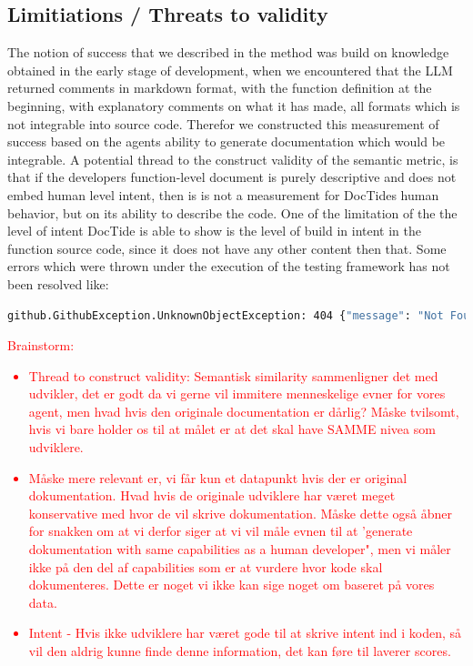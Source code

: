 \subsection{Limitiations / Threats to validity}
The notion of success that we described in the method  was build on knowledge obtained in the early stage of development, when we encountered that the LLM returned comments in markdown format, with the function definition at the beginning, with explanatory comments on what it has made, all formats which is not integrable into source code. Therefor we constructed this measurement of success based on the agents ability to generate documentation which would be integrable.
A potential thread to the construct validity of the semantic metric, is that if the developers function-level document is purely descriptive and does not embed human level intent, then is is not a measurement for DocTides human behavior, but on its ability to describe the code. One of the limitation of the the level of intent DocTide is able to show is the level of build in intent in the function source code, since it does not have any other content then that. Some errors which were thrown under the execution of the testing framework has not been resolved like:
\begin{lstlisting}[language=bash, label={lst:unresolved_errors}, caption=Unresloved errors ]
    github.GithubException.UnknownObjectException: 404 {"message": "Not Found", "documentation_url": "https://docs.github.com/rest/repos/contents#get-repository-content", "status": "404"}
\end{lstlisting}

\textcolor{red}{Brainstorm: \begin{itemize}
    \item Thread to construct validity: Semantisk similarity sammenligner det med udvikler, det er godt da vi gerne vil immitere menneskelige evner for vores agent, men hvad hvis den originale documentation er dårlig? Måske tvilsomt, hvis vi bare holder os til at målet er at det skal have SAMME nivea som udviklere.
    \item Måske mere relevant er, vi får kun et datapunkt hvis der er original dokumentation. Hvad hvis de originale udviklere har været meget konservative med hvor de vil skrive dokumentation. Måske dette også åbner for snakken om at vi derfor siger at vi vil måle evnen til at 'generate dokumentation with same capabilities as a human developer", men vi måler ikke på den del af capabilities som er at vurdere hvor kode skal dokumenteres. Dette er noget vi ikke kan sige noget om baseret på vores data.
    \item Intent - Hvis ikke udviklere har været gode til at skrive intent ind i koden, så vil den aldrig kunne finde denne information, det kan føre til laverer scores.
\end{itemize}}